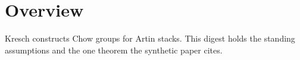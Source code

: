 \section*{Overview}
Kresch constructs Chow groups for Artin stacks. This digest holds the standing assumptions and the one theorem the synthetic paper cites.

